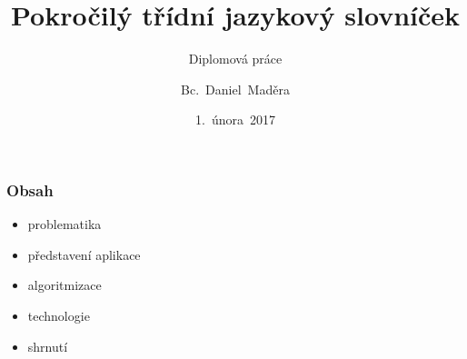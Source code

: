 




\usepackage{palatino}
\usepackage{graphicx}
\usepackage{transparent}


\title[Pokročilý třídní jazykový slovníček]{Pokročilý třídní jazykový slovníček}
\subtitle{Diplomová práce}
\author[Bc.~Daniel~Maděra]{Bc.~Daniel~Maděra}
\date{1.~února~2017}
\newcommand{\TextTitulniStranaPodLinkou}{\tiny
Studentská 2 {\color{FM_TUL} |} 461\,17 Liberec 2 {\color{FM_TUL} |} {daniel.madera@tul.cz} {\color{FM_TUL} |} 
\href{http://www.fm.tul.cz/}{www.fm.tul.cz}}

\renewcommand{\inserttotalframenumber}{\pageref{lastslide}}




\begin{frame}
    \titlepage
\end{frame}

\begin{frame}
    \frametitle{Obsah}
    \begin{itemize}
        \item problematika
        \item představení aplikace
        \item algoritmizace
        \item technologie
        \item shrnutí
    \end{itemize}
\end{frame}


